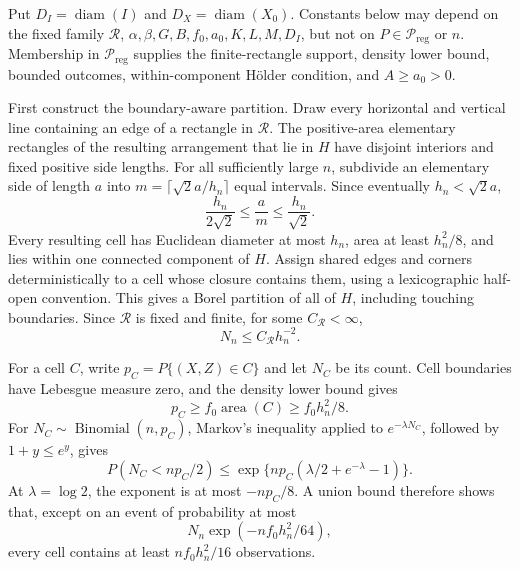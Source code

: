 Put \(D_I=\operatorname{diam}(I)\) and \(D_X=\operatorname{diam}(X_0)\).  Constants below may depend on the fixed family \(\mathscr R\), \(\alpha,\beta,G,B,f_0,a_0,K,L,M,D_I\), but not on \(P\in\mathcal P_{\mathrm{reg}}\) or \(n\).  Membership in \(\mathcal P_{\mathrm{reg}}\) supplies the finite-rectangle support, density lower bound, bounded outcomes, within-component H\"older condition, and \(A\geq a_0>0\).

First construct the boundary-aware partition.  Draw every horizontal and vertical line containing an edge of a rectangle in \(\mathscr R\).  The positive-area elementary rectangles of the resulting arrangement that lie in \(H\) have disjoint interiors and fixed positive side lengths.  For all sufficiently large \(n\), subdivide an elementary side of length \(a\) into \(m=\lceil\sqrt2a/h_n\rceil\) equal intervals.  Since eventually \(h_n<\sqrt2a\),
\[
 \frac{h_n}{2\sqrt2}\leq\frac{a}{m}\leq\frac{h_n}{\sqrt2}.
\]
Every resulting cell has Euclidean diameter at most \(h_n\), area at least \(h_n^2/8\), and lies within one connected component of \(H\).  Assign shared edges and corners deterministically to a cell whose closure contains them, using a lexicographic half-open convention.  This gives a Borel partition of all of \(H\), including touching boundaries.  Since \(\mathscr R\) is fixed and finite, for some \(C_{\mathscr R}<\infty\),
\[
 N_n\leq C_{\mathscr R}h_n^{-2}.
\]

For a cell \(C\), write \(p_C=P\{(X,Z)\in C\}\) and let \(N_C\) be its count.  Cell boundaries have Lebesgue measure zero, and the density lower bound gives
\[
 p_C\geq f_0\operatorname{area}(C)\geq f_0h_n^2/8.
\]
For \(N_C\sim\operatorname{Binomial}(n,p_C)\), Markov's inequality applied to \(e^{-\lambda N_C}\), followed by \(1+y\leq e^y\), gives
\[
 P(N_C<np_C/2)
 \leq\exp\{np_C(\lambda/2+e^{-\lambda}-1)\}.
\]
At \(\lambda=\log2\), the exponent is at most \(-np_C/8\).  A union bound therefore shows that, except on an event of probability at most
\[
 N_n\exp(-nf_0h_n^2/64),
\]
every cell contains at least \(nf_0h_n^2/16\) observations.

